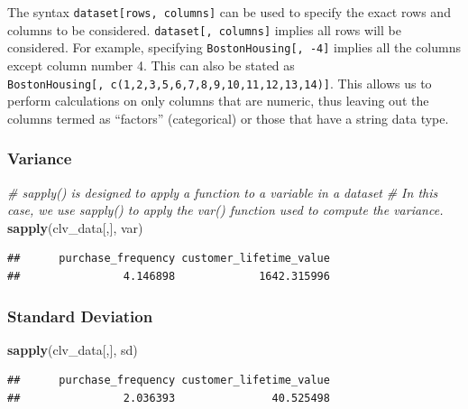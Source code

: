 \documentclass[
]{article}
\newenvironment{Shaded}{\begin{snugshade}}{\end{snugshade}}
\newcommand{\CommentTok}[1]{\textcolor[rgb]{0.56,0.35,0.01}{\textit{#1}}}
\newcommand{\FunctionTok}[1]{\textcolor[rgb]{0.13,0.29,0.53}{\textbf{#1}}}
\newcommand{\NormalTok}[1]{#1}
\begin{document}
The syntax \texttt{dataset{[}rows,\ columns{]}} can be used to specify
the exact rows and columns to be considered.
\texttt{dataset{[},\ columns{]}} implies all rows will be considered.
For example, specifying \texttt{BostonHousing{[},\ -4{]}} implies all
the columns except column number 4. This can also be stated as
\texttt{BostonHousing{[},\ c(1,2,3,5,6,7,8,9,10,11,12,13,14){]}}. This
allows us to perform calculations on only columns that are numeric, thus
leaving out the columns termed as ``factors'' (categorical) or those
that have a string data type.

\subsubsection{\texorpdfstring{\textbf{Variance}}{Variance}}\label{variance}

\begin{Shaded}
\begin{Highlighting}[]
\CommentTok{\# \textasciigrave{}sapply()\textasciigrave{} is designed to apply a function to a variable in a dataset}
\CommentTok{\# In this case, we use \textasciigrave{}sapply()\textasciigrave{} to apply the \textasciigrave{}var()\textasciigrave{} function used to compute the variance.}
\FunctionTok{sapply}\NormalTok{(clv\_data[,], var)}
\end{Highlighting}
\end{Shaded}

\begin{verbatim}
##      purchase_frequency customer_lifetime_value 
##                4.146898             1642.315996
\end{verbatim}

\subsubsection{\texorpdfstring{\textbf{Standard
Deviation}}{Standard Deviation}}\label{standard-deviation}

\begin{Shaded}
\begin{Highlighting}[]
\FunctionTok{sapply}\NormalTok{(clv\_data[,], sd)}
\end{Highlighting}
\end{Shaded}

\begin{verbatim}
##      purchase_frequency customer_lifetime_value 
##                2.036393               40.525498
\end{verbatim}
\end{document}
